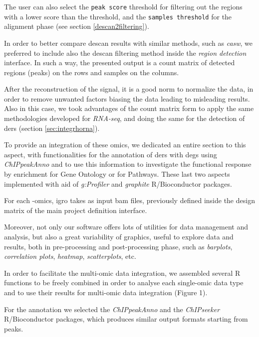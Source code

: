 The user can also select the \lstinline!peak score! threshold for filtering out the regions with a lower score than the threshold, and the \lstinline!samples threshold! for the alignment phase (see section \ref{descan2filtering}).

In order to better compare \gls{descan} results with similar methods, such as \textit{casw}, we preferred to include also the \gls{descan} filtering method inside the \textit{region detection} interface.
In such a way, the presented output is a count matrix of detected regions (peaks) on the rows and samples on the columns.

After the reconstruction of the signal, it is a good norm to normalize the data, in order to remove unwanted factors biasing the data leading to misleading results.
Also in this case, we took advantages of the count matrix form to apply the same methodologies developed for \textit{RNA-seq}, and doing the same for the detection of \glspl{der} (section \ref{sec:integrhorna}).


To provide an integration of these omics, we dedicated an entire section to this aspect, with functionalities for the annotation of \glspl{der} with \glspl{deg} using \textit{ChIPpeakAnno} and to use this information to investigate the functional response by enrichment for Gene Ontology or for Pathways.
These last two aspects implemented with aid of \textit{g:Profiler} \cite{Reimand2016} and \textit{graphite} \cite{Sales2012a} R/Bioconductor packages.


For each -omics, \gls{igro} takes as input \gls{bam} files, previously defined inside the design matrix of the main project definition interface.

Moreover, not only our software offers lots of utilities for data management and analysis, but also a great variability of graphics, useful to explore data and results, both in pre-processing and post-processing phase, such as \textit{barplots}, \textit{correlation plots}, \textit{heatmap}, \textit{scatterplots}, etc.

In order to facilitate the multi-omic data integration, we assembled several R functions to be freely combined in order to analyse each single-omic data type and to use their results for multi-omic data integration (Figure 1).

For the annotation we selected the \textit{ChIPpeakAnno} and the \textit{ChIPseeker} R/Bioconductor packages, which produces similar output formats starting from peaks.